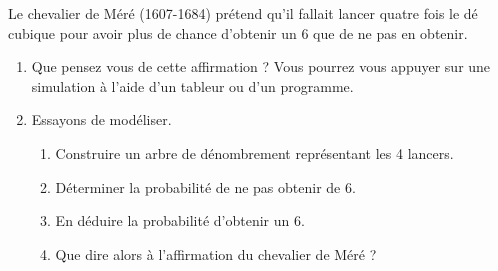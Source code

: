 
Le chevalier de Méré (1607-1684) prétend qu'il fallait lancer quatre fois le dé cubique pour avoir plus de chance d'obtenir un 6 que de ne pas en obtenir.
\begin{enumerate}
\item Que pensez vous de cette affirmation ? Vous pourrez vous appuyer sur une simulation à l'aide d'un tableur ou d'un programme.
\item Essayons de modéliser.
	\begin{enumerate}
		\item Construire un arbre de dénombrement représentant les 4 lancers.  
		\item Déterminer la probabilité de ne pas obtenir de 6.
		\item En déduire la probabilité d'obtenir un 6.	
		\item Que dire alors à l'affirmation du chevalier de Méré ?				
	\end{enumerate}
\end{enumerate}
